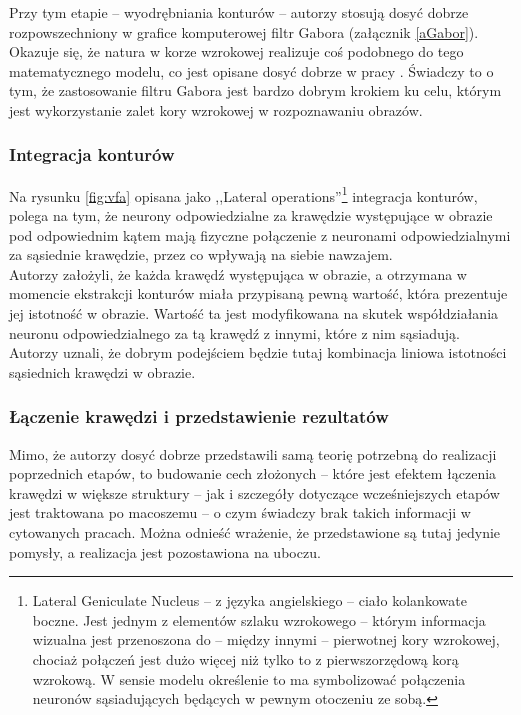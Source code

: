 Przy tym etapie -- wyodrębniania konturów -- autorzy stosują dosyć dobrze rozpowszechniony w grafice komputerowej filtr Gabora (załącznik \ref{aGabor}). Okazuje się, że natura w korze wzrokowej realizuje coś podobnego do tego matematycznego modelu, co jest opisane dosyć dobrze w pracy \cite{Jones1987}. Świadczy to o tym, że zastosowanie filtru Gabora jest bardzo dobrym krokiem ku celu, którym jest wykorzystanie zalet kory wzrokowej w rozpoznawaniu obrazów.

\subsubsection{Integracja konturów\\}

Na rysunku \ref{fig:vfa} opisana jako ,,Lateral operations''\footnote{Lateral Geniculate Nucleus -- z języka angielskiego -- ciało kolankowate boczne. Jest jednym z elementów szlaku wzrokowego -- którym informacja wizualna jest przenoszona do -- między innymi -- pierwotnej kory wzrokowej, chociaż połączeń jest dużo więcej niż tylko to z pierwszorzędową korą wzrokową. W sensie modelu określenie to ma symbolizować połączenia neuronów sąsiadujących będących w pewnym otoczeniu ze sobą.} integracja konturów, polega na tym, że neurony odpowiedzialne za krawędzie występujące w obrazie pod odpowiednim kątem mają fizyczne połączenie z neuronami odpowiedzialnymi za sąsiednie krawędzie, przez co wpływają na siebie nawzajem.\\

Autorzy założyli, że każda krawędź występująca w obrazie, a otrzymana w momencie ekstrakcji konturów miała przypisaną pewną wartość, która prezentuje jej istotność w obrazie. Wartość ta jest modyfikowana na skutek współdziałania neuronu odpowiedzialnego za tą krawędź z innymi, które z nim sąsiadują. Autorzy uznali, że dobrym podejściem będzie tutaj kombinacja liniowa istotności sąsiednich krawędzi w obrazie.

\subsubsection{Łączenie krawędzi i przedstawienie rezultatów\\}

Mimo, że autorzy dosyć dobrze przedstawili samą teorię potrzebną do realizacji poprzednich etapów, to budowanie cech złożonych -- które jest efektem łączenia krawędzi w większe struktury -- jak i szczegóły dotyczące wcześniejszych etapów jest traktowana po macoszemu -- o czym świadczy brak takich informacji w cytowanych pracach. Można odnieść wrażenie, że przedstawione są tutaj jedynie pomysły, a realizacja jest pozostawiona na uboczu.\\

